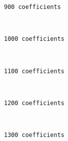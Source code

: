     \begin{Verbatim}[commandchars=\\\{\}]
900 coefficients
    \end{Verbatim}

    \begin{center}
    \end{center}
    { \hspace*{\fill} \\}
    
    \begin{Verbatim}[commandchars=\\\{\}]
1000 coefficients
    \end{Verbatim}

    \begin{center}
    \end{center}
    { \hspace*{\fill} \\}
    
    \begin{Verbatim}[commandchars=\\\{\}]
1100 coefficients
    \end{Verbatim}

    \begin{center}
    \end{center}
    { \hspace*{\fill} \\}
    
    \begin{Verbatim}[commandchars=\\\{\}]
1200 coefficients
    \end{Verbatim}

    \begin{center}
    \end{center}
    { \hspace*{\fill} \\}
    
    \begin{Verbatim}[commandchars=\\\{\}]
1300 coefficients
    \end{Verbatim}

    \begin{center}
    \end{center}
    { \hspace*{\fill} \\}
    
